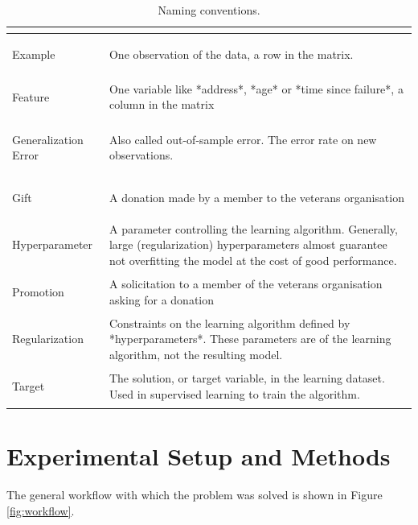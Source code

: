 \documentclass[
  11pt,
  a4paper,
  DIV=12,captions=tableheading,oneside]{scrbook}
\begin{document}
\begin{table}[!h]

\caption{\label{tab:glossary-table}Naming conventions.}
\centering
\begin{tabular}{>{\bfseries\raggedright\arraybackslash}p{3cm}>{\raggedright\arraybackslash}p{10cm}}
\toprule
 & \\
\midrule
Example & One observation of the data, a row in the matrix.\\
Feature & One variable like *address*, *age* or *time since failure*, a column in the matrix\\
Generalization Error & Also called out-of-sample error. The error rate on new observations.\\
Gift & A donation made by a member to the veterans organisation\\
Hyperparameter & A parameter controlling the learning algorithm. Generally, large (regularization) hyperparameters almost guarantee not overfitting the model at the cost of good performance.\\
\addlinespace
Promotion & A solicitation to a member of the veterans organisation asking for a donation\\
Regularization & Constraints on the learning algorithm defined by *hyperparameters*. These parameters are of the learning algorithm, not the resulting model.\\
Target & The solution, or target variable, in the learning dataset. Used in supervised learning to train the algorithm.\\
\bottomrule
\end{tabular}
\end{table}

\hypertarget{experimental-setup-and-methods}{%
\chapter{Experimental Setup and Methods}\label{experimental-setup-and-methods}}

The general workflow with which the problem was solved is shown in Figure \ref{fig:workflow}.
\end{document}
